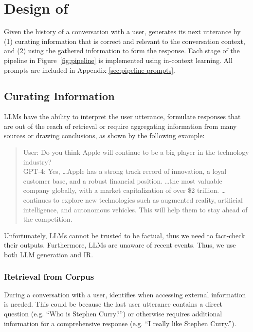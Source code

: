 \section{Design of \system}

Given the history of a conversation with a user, 
\system generates its next utterance by 
(1) curating information that is correct and relevant to the conversation context, and
(2) using the gathered information to form the response. 
Each stage of the pipeline in Figure~\ref{fig:pipeline}
is implemented using in-context learning. All prompts are included in Appendix \ref{sec:pipeline-prompts}. 

\subsection{Curating Information}
LLMs have the ability to interpret the user utterance, formulate responses that are out of the reach of retrieval or require aggregating information from many sources or drawing conclusions, as shown by 
the following example:
\begin{quote}\small

User: Do you think Apple will continue to be a big player in the technology industry? \\
GPT-4: Yes, \ldots Apple has a strong track record of innovation, a loyal customer base, and a robust financial position. \ldots the most valuable company globally, with a market capitalization of over \$2 trillion. \ldots continues to explore new technologies such as augmented reality, artificial intelligence, and autonomous vehicles. This will help them to stay ahead of the competition.
\end{quote}

Unfortunately, LLMs cannot be trusted to be factual, thus we need to fact-check their outputs. Furthermore, LLMs are unaware of recent events.
Thus, we use both LLM generation and IR.

\subsubsection{Retrieval from Corpus}
\label{sec:IR}
During a conversation with a user, \system identifies when accessing external information is needed. This could be because the last user utterance contains a direct question (e.g. ``Who is Stephen Curry?'') or otherwise requires additional information for a comprehensive response (e.g. ``I really like Stephen Curry.''). 

